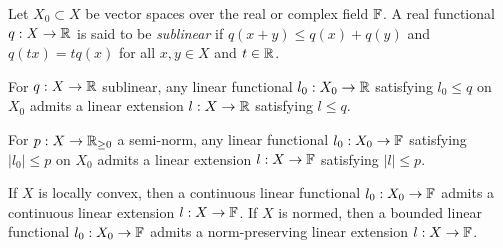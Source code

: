\documentclass{../../large}
\begin{document}
\begin{prb}
Let $X_0\subset X$ be vector spaces over the real or complex field $\mathbb{F}$.
A real functional $q:X\to\mathbb{R}$ is said to be \emph{sublinear} if $q(x+y)\le q(x)+q(y)$ and $q(tx)=tq(x)$ for all $x,y\in X$ and $t\in\mathbb{R}$.
\begin{parts}
\item For $q:X\to\mathbb{R}$ sublinear, any linear functional $l_0:X_0\to\mathbb{R}$ satisfying $l_0\le q$ on $X_0$ admits a linear extension $l:X\to\mathbb{R}$ satisfying $l\le q$.
\item For $p:X\to\mathbb{R}_{\ge0}$ a semi-norm, any linear functional $l_0:X_0\to\mathbb{F}$ satisfying $|l_0|\le p$ on $X_0$ admits a linear extension $l:X\to\mathbb{F}$ satisfying $|l|\le p$.
\item If $X$ is locally convex, then a continuous linear functional $l_0:X_0\to\mathbb{F}$ admits a continuous linear extension $l:X\to\mathbb{F}$.
If $X$ is normed, then a bounded linear functional $l_0:X_0\to\mathbb{F}$ admits a norm-preserving linear extension $l:X\to\mathbb{F}$.
\end{parts}
\end{prb}
\end{document}
